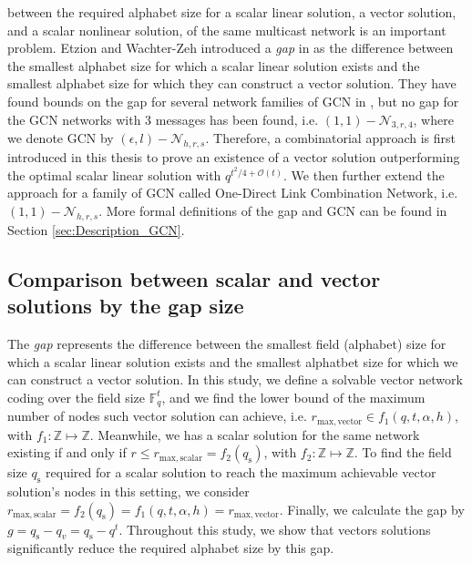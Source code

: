 between the required alphabet size for a scalar linear solution, a
vector solution, and a scalar nonlinear solution, of the same multicast
network is an important problem. Etzion and Wachter-Zeh introduced
a \textit{gap} in \cite{Etzion:2016} as the difference between the
smallest alphabet size for which a scalar linear solution exists and
the smallest alphabet size for which they can construct a vector solution.
They have found bounds on the gap for several network families of
GCN in \cite{Etzion:2016,Wachter-Zeh:2018}, but no gap for the GCN
networks with 3 messages has been found, i.e. $(1,1)-\mathcal{N}_{3,r,4}$,
where we denote GCN by $(\epsilon,l)-\mathcal{N}_{h,r,s}$. Therefore,
a combinatorial approach is first introduced in this thesis to prove
an existence of a vector solution outperforming the optimal scalar
linear solution with $q^{t^{2}/4+\mathcal{O}(t)}$. We then further
extend the approach for a family of GCN called One-Direct Link Combination
Network, i.e. $(1,1)-\mathcal{N}_{h,r,s}$. More formal definitions
of the gap and GCN can be found in Section \ref{sec:Description_GCN}.

\subsection{Comparison between scalar and vector solutions by the gap size \label{subsec:Comparison-between-scalar-and-vector-sol}}

The \textit{gap} represents the difference between the smallest field
(alphabet) size for which a scalar linear solution exists and the
smallest alphatbet size for which we can construct a vector solution.
In this study, we define a solvable vector network coding over the
field size $\ensuremath{\mathbb{F}}_{q}^{t}$, and we find the lower
bound of the maximum number of nodes such vector solution can achieve,
i.e. $r_{\mathrm{max,vector}}\in f_{1}(q,t,\alpha,h)$, with $f_{1}:\mathbb{Z}\mapsto\mathbb{Z}$.
Meanwhile, we has a scalar solution for the same network existing
if and only if $r\leq r_{\mathrm{max,scalar}}=f_{2}\left(q_{\mathrm{s}}\right)$,
with $f_{2}:\mathbb{Z}\mapsto\mathbb{Z}$. To find the field size
$q_{\mathrm{s}}$ required for a scalar solution to reach the maximum
achievable vector solution's nodes in this setting, we consider $r_{\mathrm{max,scalar}}=f_{2}\left(q_{\mathrm{s}}\right)=f_{1}(q,t,\alpha,h)=r_{\mathrm{max,vector}}$.
Finally, we calculate the gap by $g=q_{\mathrm{s}}-q_{v}=q_{\mathrm{s}}-q^{t}.$
Throughout this study, we show that vectors solutions significantly
reduce the required alphabet size by this gap.

\clearpage